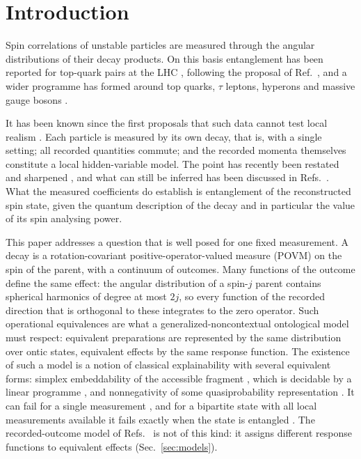 \section{Introduction}

Spin correlations of unstable particles are measured through the angular distributions of their decay products. On this basis entanglement has been reported for top-quark pairs at the LHC \cite{atlas2024,cms2024,cms2024ljets}, following the proposal of Ref.~\cite{afik2021}, and a wider programme has formed around top quarks, $\tau$ leptons, hyperons and massive gauge bosons \cite{barr2024,ashby2023,tornqvist1981,besiii2025}.

It has been known since the first proposals that such data cannot test local realism \cite{abel1992}. Each particle is measured by its own decay, that is, with a single setting; all recorded quantities commute; and the recorded momenta themselves constitute a local hidden-variable model. The point has recently been restated and sharpened \cite{abel2025,bechtle2025,low2025}, and what can still be inferred has been discussed in Refs.~\cite{li2024,fabbrichesi2025bell}. What the measured coefficients do establish is entanglement of the reconstructed spin state, given the quantum description of the decay and in particular the value of its spin analysing power.

This paper addresses a question that is well posed for one fixed measurement. A decay is a rotation-covariant positive-operator-valued measure (POVM) on the spin of the parent, with a continuum of outcomes. Many functions of the outcome define the same effect: the angular distribution of a spin-$j$ parent contains spherical harmonics of degree at most $2j$, so every function of the recorded direction that is orthogonal to these integrates to the zero operator. Such operational equivalences are what a generalized-noncontextual ontological model \cite{spekkens2005} must respect: equivalent preparations are represented by the same distribution over ontic states, equivalent effects by the same response function. The existence of such a model is a notion of classical explainability with several equivalent forms: simplex embeddability of the accessible fragment \cite{schmid2021,gitton2022,selby2023frag}, which is decidable by a linear programme \cite{selby2024lp}, and nonnegativity of some quasiprobability representation \cite{spekkens2008}. It can fail for a single measurement \cite{selby2023incomp}, and for a bipartite state with all local measurements available it fails exactly when the state is entangled \cite{plavala2024}. The recorded-outcome model of Refs.~\cite{abel1992,abel2025} is not of this kind: it assigns different response functions to equivalent effects (Sec.~\ref{sec:models}).

